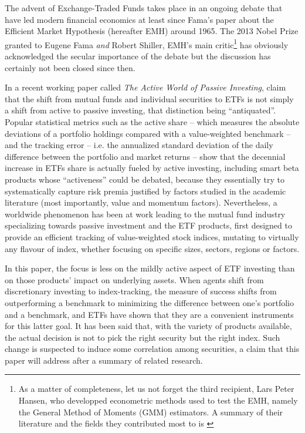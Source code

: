The advent of Exchange-Traded Funds takes place in an ongoing debate that have led modern financial economics at least since Fama's paper about the Efficient Market Hypothesis (hereafter EMH) around 1965. The 2013 Nobel Prize granted to Eugene Fama \textit{and} Robert Shiller, EMH's main critic\footnote{As a matter of completeness, let us not forget the third recipient, Lars Peter Hansen, who developped econometric methods used to test the EMH, namely the General Method of Moments (GMM) estimators. A summary of their literature and the fields they contributed most to is \textcite{EconomicSciencesPrizeCommitteeoftheRoyalSwedishAcademyofSciences2012}} has obviously acknowledged the secular importance of the debate but the discussion has certainly not been closed since then.

In a recent working paper called \textit{The Active World of Passive Investing}, \textcite{Easley2018} claim that the shift from mutual funds and individual securities to ETFs is not simply a shift from active to passive investing, that distinction being ``antiquated''. Popular statistical metrics such as the active share -- which measures the absolute deviations of a portfolio holdings compared with a value-weighted benchmark -- and the tracking error -- i.e. the annualized standard deviation of the daily difference between the portfolio and market returns -- show that the decennial increase in ETFs share is actually fueled by active investing, including smart beta products whose ``activeness'' could be debated, because they essentially try to systematically capture risk premia justified by factors studied in the academic literature (most importantly, value and momentum factors). Nevertheless, a worldwide phenomenon has been at work leading to the mutual fund industry specializing towards passive investment and the ETF products, first designed to provide an efficient tracking of value-weighted stock indices, mutating to virtually any flavour of index, whether focusing on specific sizes, sectors, regions or factors.

In this paper, the focus is less on the mildly active aspect of ETF investing than on those products' impact on underlying assets. When agents shift from discretionary investing to index-tracking, the measure of success shifts from outperforming a benchmark to minimizing the difference between one's portfolio and a benchmark, and ETFs have shown that they are a convenient instruments for this latter goal. It has been said that, with the variety of products available, the actual decision is not to pick the right security but the right index. Such change is suspected to induce some correlation among securities, a claim that this paper will address after a summary of related research.

